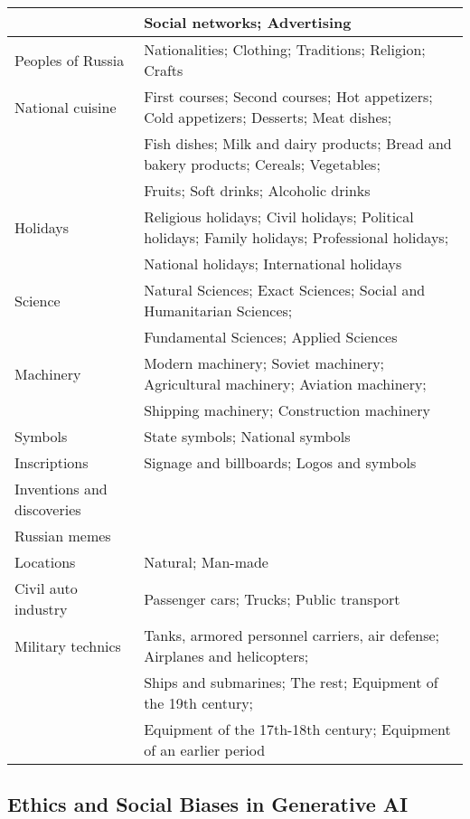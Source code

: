 \begin{table*}[!t]
\begin{tabular}{ll}
    & Social networks; Advertising\\
    \hline
    Peoples of Russia & Nationalities; Clothing; Traditions; Religion; Crafts\\
    \hline
    National cuisine & First courses; Second courses; Hot appetizers; Cold appetizers; Desserts; Meat dishes;\\
    & Fish dishes; Milk and dairy products; Bread and bakery products; Cereals; Vegetables;\\
    & Fruits; Soft drinks; Alcoholic drinks\\
    \hline
    Holidays & Religious holidays; Civil holidays; Political holidays; Family holidays; Professional holidays;\\
    & National holidays; International holidays\\
    \hline
    Science & Natural Sciences; Exact Sciences; Social and Humanitarian Sciences;\\
    & Fundamental Sciences; Applied Sciences\\
    \hline
    Machinery & Modern machinery; Soviet machinery; Agricultural machinery; Aviation machinery;\\
    & Shipping machinery; Construction machinery\\
    \hline
    Symbols & State symbols; National symbols\\
    \hline
    Inscriptions & Signage and billboards; Logos and symbols\\
    \hline
    Inventions and discoveries & \\
    \hline
    Russian memes & \\
    \hline
    Locations & Natural; Man-made\\
    \hline
    Civil auto industry & Passenger cars; Trucks; Public transport\\
    \hline
    Military technics & Tanks, armored personnel carriers, air defense; Airplanes and helicopters;\\
    & Ships and submarines; The rest; Equipment of the 19th century;\\
    & Equipment of the 17th-18th century; Equipment of an earlier period\\
    \hline
\end{tabular}
\label{tab:categories}
\end{table*}

\subsection{Ethics and Social Biases in Generative AI}

